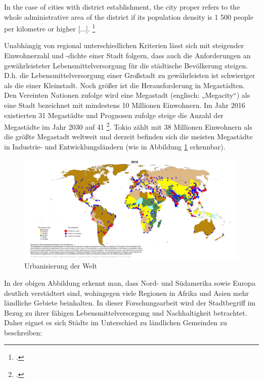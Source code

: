 \documentclass{scrartcl}
\begin{document}
\begin{displayquote}
In the case of cities with district establishment, the city proper refers to the whole administrative area of the district if its population density is 1 500 people per kilometre or higher [...]. \footcite[S.~2]{UnitedNations2005Table2005} 
\end{displayquote}

Unabhängig von regional unterschiedlichen Kriterien lässt sich mit steigender Einwohnerzahl und -dichte einer Stadt folgern, dass auch die Anforderungen an gewährleisteter Lebensmittelversorgung für die städtische Bevölkerung steigen. D.h. die Lebensmittelversorgung einer Großstadt zu gewährleisten ist schwieriger als die einer Kleinstadt. Noch größer ist die Herausforderung in Megastädten. Den Vereinten Nationen zufolge wird eine Megastadt (englisch: „Megacity“) als eine Stadt bezeichnet mit mindestens 10 Millionen Einwohnern. Im Jahr 2016 existierten 31 Megastädte und Prognosen zufolge steige die Anzahl der Megastädte im Jahr 2030 auf 41 \footcite{UnitedNations2016The2016}. Tokio zählt mit 38 Millionen Einwohnern als die größte Megastadt weltweit und derzeit befinden sich die meisten Megastädte in Industrie- und Entwicklungsländern (wie in Abbildung \ref{figUrban} erkennbar). 

\begin{figure}[h]
\centering
\hspace*{-3cm}   
\includegraphics[width=20cm]{image_folder/CityPop_Urban.png}
\caption{Urbanisierung der Welt}
\label{figUrban}
\end{figure}

In der obigen Abbildung erkennt man, dass Nord- und Südamerika sowie Europa deutlich verstädtert sind, wohingegen viele Regionen in Afrika und Asien mehr ländliche Gebiete beinhalten. In dieser Forschungsarbeit wird der Stadtbegriff im Bezug zu ihrer fähigen Lebensmittelversorgung und Nachhaltigkeit betrachtet. Daher eignet es sich Städte im Unterschied zu ländlichen Gemeinden zu beschreiben: 
\end{document}
